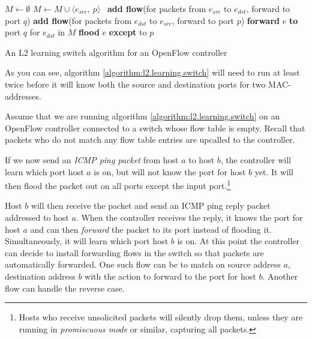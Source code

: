 \begin{algorithm}
  \begin{algorithmic}
    \State $M \gets \emptyset$
    \State
      \State $M \gets M \cup \langle e_{src},\ p \rangle$ 
      \State
        \State \textbf{add flow}(for packets from $e_{src}$ to $e_{dst}$, forward to port $q$)
        \State \textbf{add flow}(for packets from $e_{dst}$ to $e_{src}$, forward to port $p$)
        \State \textbf{forward} $e$ \textbf{to} port $q$ for $e_{dst}$ in $M$
      \Else
        \State \textbf{flood} $e$ \textbf{except} to $p$ 
      \EndIf
    \EndOn
  \end{algorithmic}
  \caption{An L2 learning switch algorithm for an OpenFlow controller}
  \label{algorithm:l2.learning.switch}
\end{algorithm}

As you can see, algorithm \ref{algorithm:l2.learning.switch} will need to
run at least twice before it will know both the source and destination ports
for two MAC-addresses.

Assume that we are running algorithm \ref{algorithm:l2.learning.switch} on
an OpenFlow controller connected to a switch whose flow table is empty.
%
Recall that packets who do not match any flow table entries are upcalled to
the controller.

If we now send an \textit{\acs{ICMP} ping packet} from host $a$ to
host $b$, the controller will learn which port host $a$ is on, but will not know
the port for host $b$ yet.
%
It will then flood the packet out on all ports except the input port.\footnote{
Hosts who receive unsolicited packets will silently drop them,
unless they are running in \textit{promiscuous mode} or similar, capturing
all packets.}

Host $b$ will then receive the packet and send an \acs{ICMP} ping reply packet
addressed to host $a$.
%
When the controller receives the reply, it knows the port for host $a$ and
can then \textit{forward} the packet to its port instead of flooding it.
%
Simultaneously, it will learn which port host $b$ is on.
%
At this point the controller can decide to install forwarding flows in the
switch so that packets are automatically forwarded.
%
One such flow can be to match on source address $a$, destination address
$b$ with the action to forward to the port for host $b$.
%
Another flow can handle the reverse case.

